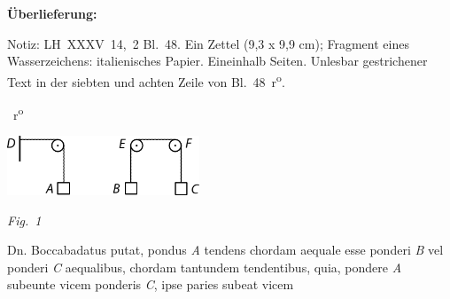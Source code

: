 %
%
%
%
%
\frenchspacing%
%
\begin{ledgroupsized}[r]{120mm}
\footnotesize
\pstart
\noindent\textbf{Überlieferung:}
\pend
\end{ledgroupsized}
\begin{ledgroupsized}[r]{114mm}
\footnotesize
\pstart \parindent -6mm
%
Notiz: LH~XXXV~14,~2 Bl.~48.
Ein Zettel (9,3 x 9,9 cm);
Fragment eines Wasserzeichens:
italienisches Papier.
Eineinhalb Seiten.
Unlesbar gestrichener Text in der siebten und achten Zeile von Bl.~48~r\textsuperscript{o}.
\pend
\end{ledgroupsized}
%
%
\frenchspacing%
%
%
\count{}
\count{}
\count{}
%
\vspace{8mm}
\pstart%
\normalsize%
\noindent%
%
~r\textsuperscript{o}\rbrack\ %
%
\pend%
\vspace{0.5em}
%
  \centerline{\includegraphics[width=0.43\textwidth]{gesamttex/edit_VIII,3/images/LH_35_14_02_048_d1.pdf}}%
  \vspace{0.5em}
  \centerline{\lbrack\textit{Fig.~1}\rbrack}%
    \vspace{1.5em}%
%
\pstart%
\noindent%
Dn. Boccabadatus\protect{}
putat, pondus \textit{A} tendens\protect{}
chordam\protect{} aequale esse ponderi \textit{B} vel ponderi \textit{C} aequalibus,
chordam tantundem tendentibus,
quia,
pondere \textit{A} subeunte vicem ponderis \textit{C},
ipse paries\protect{} subeat vicem
